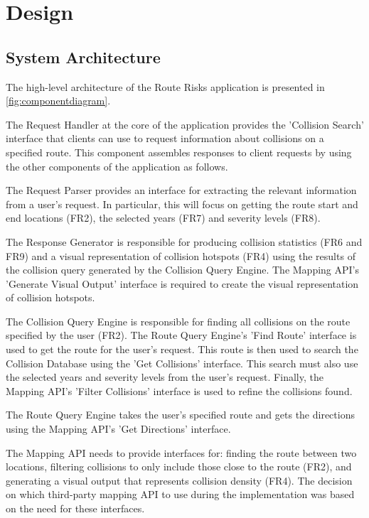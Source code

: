 \documentclass[authoryearcitations]{UoYCSproject}
\begin{document}
\chapter{Design}

\section{System Architecture}

The high-level architecture of the Route Risks application is presented in \autoref{fig:componentdiagram}.

The Request Handler at the core of the application provides the 'Collision Search' interface that clients can use to request information about collisions on a specified route. This component assembles responses to client requests by using the other components of the application as follows.

The Request Parser provides an interface for extracting the relevant information from a user's request. In particular, this will focus on getting the route start and end locations (FR2), the selected years (FR7) and severity levels (FR8).

The Response Generator is responsible for producing collision statistics (FR6 and FR9) and a visual representation of collision hotspots (FR4) using the results of the collision query generated by the Collision Query Engine. The Mapping API's 'Generate Visual Output' interface is required to create the visual representation of collision hotspots.

The Collision Query Engine is responsible for finding all collisions on the route specified by the user (FR2). The Route Query Engine's 'Find Route' interface is used to get the route for the user's request. This route is then used to search the Collision Database using the 'Get Collisions' interface. This search must also use the selected years and severity levels from the user's request. Finally, the Mapping API's 'Filter Collisions' interface is used to refine the collisions found. 

The Route Query Engine takes the user's specified route and gets the directions using the Mapping API's 'Get Directions' interface.

The Mapping API needs to provide interfaces for: finding the route between two locations, filtering collisions to only include those close to the route (FR2), and generating a visual output that represents collision density (FR4). The decision on which third-party mapping API to use during the implementation was based on the need for these interfaces.
\end{document}

